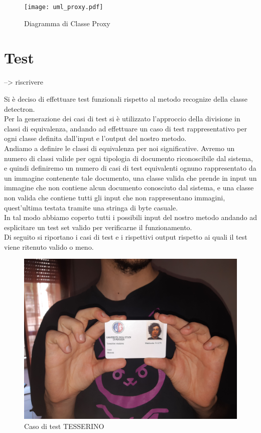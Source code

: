 \documentclass[12pt,a4paper]{article}
\begin{document}
\begin{figure}[H]
    \caption{Diagramma di Classe Proxy}
    \centering
    \texttt{[image: uml\_proxy.pdf]}
\end{figure}

\section{Test}

--> riscrivere %

Si è deciso di effettuare test funzionali rispetto al metodo recognize
della classe detectron.\\
Per la generazione dei casi di test si è utilizzato l'approccio della
divisione in classi di equivalenza, andando ad effettuare un caso di
test rappresentativo per ogni classe definita dall'input e l'output del nostro
metodo.\\
Andiamo a definire le classi di equivalenza per noi significative.
Avremo un numero di classi valide per ogni tipologia di documento
riconoscibile dal sistema, e quindi definiremo un numero di casi di
test equivalenti ognuno rappresentato da un immagine contenente tale
documento, una classe valida che prende in input un
immagine che non contiene alcun documento conosciuto dal sistema, e una
classe non valida che contiene tutti gli input che non rappresentano
immagini, quest'ultima testata tramite una stringa di byte casuale.\\
In tal modo abbiamo coperto tutti i possibili input del nostro metodo
andando ad esplicitare un test set valido per verificarne il
funzionamento.\\

Di seguito si riportano i casi di test e i rispettivi output rispetto ai
quali il test viene ritenuto valido o meno.

\begin{figure}[H]
    \caption{Caso di test TESSERINO}
    \centering
    \includegraphics[width=\textwidth,height=\textheight,keepaspectratio]{test_tesserino.jpg}
\end{figure}
\end{document}

